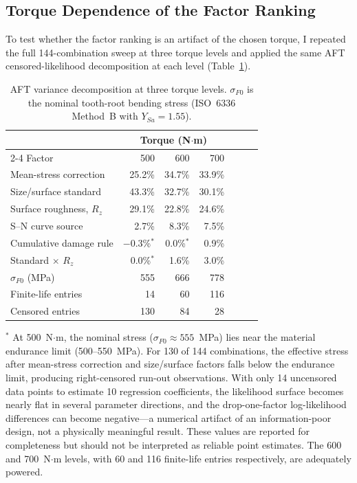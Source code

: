 \documentclass[12pt,a4paper]{article}
\begin{document}
\subsection{Torque Dependence of the Factor Ranking}
\label{sec:torque}

To test whether the factor ranking is an artifact of the chosen torque,
I repeated the full 144-combination sweep at three torque levels and
applied the same AFT censored-likelihood decomposition at each level
(Table~\ref{tab:torque}).

\begin{table}[h]
\centering
\caption{AFT variance decomposition at three torque levels.
$\sigma_{F0}$ is the nominal tooth-root bending stress (ISO~6336
Method~B with $Y_{Sa}=1.55$).%
}
\label{tab:torque}
\begin{tabular}{lrrrrrr}
\toprule
& \multicolumn{3}{c}{Torque (N$\cdot$m)} \\
\cmidrule(lr){2-4}
Factor & 500 & 600 & 700 \\
\midrule
Mean-stress correction & 25.2\% & 34.7\% & 33.9\% \\
Size/surface standard & 43.3\% & 32.7\% & 30.1\% \\
Surface roughness, $R_z$ & 29.1\% & 22.8\% & 24.6\% \\
S--N curve source & 2.7\% & 8.3\% & 7.5\% \\
Cumulative damage rule & $-$0.3\%$^*$ & 0.0\%$^*$ & 0.9\% \\
Standard $\times$ $R_z$ & 0.0\%$^*$ & 1.6\% & 3.0\% \\
\midrule
$\sigma_{F0}$ (MPa) & 555 & 666 & 778 \\
Finite-life entries & 14 & 60 & 116 \\
Censored entries & 130 & 84 & 28 \\
\bottomrule
\end{tabular}
\medskip\par
\small $^*$ At 500~N$\cdot$m, the nominal stress
($\sigma_{F0}\approx 555$~MPa) lies near the material endurance limit
(500--550~MPa). For 130 of 144 combinations, the effective stress after
mean-stress correction and size/surface factors falls below the
endurance limit, producing right-censored run-out observations. With
only 14 uncensored data points to estimate 10 regression coefficients,
the likelihood surface becomes nearly flat in several parameter
directions, and the drop-one-factor log-likelihood differences can
become negative---a numerical artifact of an information-poor design,
not a physically meaningful result. These values are reported for
completeness but should not be interpreted as reliable point estimates.
The 600 and 700~N$\cdot$m levels, with 60 and 116 finite-life entries
respectively, are adequately powered.
\end{table}
\end{document}
